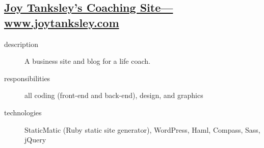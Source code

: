 \documentclass{article}
\begin{document}
\subsection{\href{http://www.joytanksley.com}
  {Joy Tanksley's Coaching Site---www.joytanksley.com}}
\label{sub:Joy Tanksley's Coaching Site}

\begin{multicols}{2}

\begin{description}
  \item[description] A business site and blog for a life coach. 
  \item[responsibilities] all coding (front-end and back-end), design, and graphics 
  \item[technologies] StaticMatic (Ruby static site generator), WordPress, Haml, Compass, Sass, jQuery 
\end{description}

\vfill
\columnbreak
{}
\end{multicols}
\end{document}
